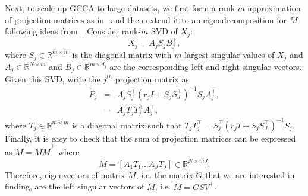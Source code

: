 \documentclass[11pt]{article}
\newcommand{\R}{\mathbb{R}}
\newcommand{\remove}[1]{}
\begin{document}
Next, to scale up GCCA to large datasets, we first form a rank-$m$ approximation of projection matrices as in~\cite{arora2012kernel} and then extend it to an eigendecomposition for $M$ following ideas from~\cite{savostyanov}. Consider rank-$m$ SVD of $X_j$:
$$X_j = A_{j} S_{j} B^\top_{j},$$
where $S_j \in \R^{m \times m}$ is the diagonal matrix with $m$-largest singular values of $X_j$ and $A_j \in \R^{N \times m}$ and $B_j \in \R^{m \times d_j}$ are the corresponding left and right singular vectors. Given this SVD, write the $j^{th}$ projection matrix as 
\begin{eqnarray}
\widetilde{P}_j &=& A_j S_j^\top(r_j I + S_j S_J^\top)^{-1}S_j A_j^\top, \nonumber \\
&=& A_j T_j T_j^\top A_j^\top, \nonumber
\end{eqnarray}
where $T_j \in \mathbb{R}^{m \times m}$ is a diagonal matrix such that 
$T_jT_j^\top = S_j^\top(r_j I + S_j S_J^\top)^{-1}S_j$. Finally, it is easy to check that the sum of projection matrices can be expressed as $M = \tilde{M} \tilde{M}^\top$
where $$\tilde{M} = \left[ A_1T_1 \ldots A_JT_J \right] \in \mathbb{R}^{N
  \times mJ}.$$
Therefore, eigenvectors of matrix $M$, i.e. the matrix $G$ that we are interested in finding, are the left singular vectors of $\tilde{M}$, i.e. $\tilde{M}=GSV^\top$. 


\remove{
Let $SVD_m$ denote a partial SVD where $S_j$ is a rectangular diagonal
matrix that contains only the $m$ largest singular values and $A_j, B_j$
are square, orthonormal, unitary matrices. Defining $SVD_m$ like this
ensures correctness but in practice we only need to compute $m$
columns of $A_j$. Take the SVD of $X_j$.
$$A_{j} S_{j} B^\top_{j} \xleftarrow{SVD_{m}} X_j$$
 Substitute the above in equation~\ref{eq:6} to get 
$$\widetilde{P}_j = A_j S_j^\top(r_j I + S_j S_J^\top)^{-1}S_j A_j^\top$$ 
Define, $T_j \in \mathbb{R}^{m \times m}$ to be the diagonal matrix such that
$T_jT_j^\top = S_j^\top(r_j I + S_j S_J^\top)^{-1}S_j $ then
$$\widetilde{P}_j = A_j T_j T_j^\top A_j^\top$$
Define, $\tilde{M} = \left[ A_1T_1 \ldots A_JT_J \right] \in \mathbb{R}^{N
  \times mJ}$
Then 
$$M = \tilde{M} \tilde{M}^\top$$
Perform QR decomposition of $\tilde{M}$ to get
$$M = Q R R^\top Q$$
Do eigen decomposition of $R R^\top \in \mathbb{R}^{mJ \times mJ}$
to get its eigen vectors $U$ and eigen values $S$.
$$M = Q U S U^\top Q^\top$$
 which implies $G = QU$. 
}
\end{document}
